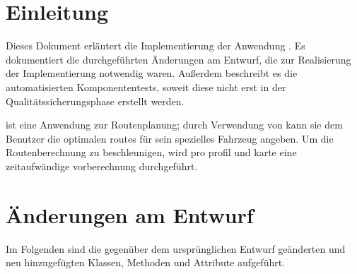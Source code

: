 \documentclass[a4paper, 11pt]{article}
\begin{document}
\section{Einleitung}
Dieses Dokument erläutert die Implementierung der Anwendung \routeKIT. Es dokumentiert die durchgeführten Änderungen am Entwurf, die zur Realisierung der Implementierung notwendig waren. Außerdem beschreibt es die automatisierten Komponententests, soweit diese nicht erst in der Qualitätssicherungsphase erstellt werden.

\routeKIT ist eine Anwendung zur Routenplanung; durch Verwendung von  kann sie dem Benutzer die optimalen \glspl{route} für sein spezielles Fahrzeug angeben.
Um die Routenberechnung zu beschleunigen, wird pro \gls{profil} und \gls{karte} eine zeitaufwändige \gls{vorberechnung} durchgeführt.

\section{Änderungen am Entwurf}
Im Folgenden sind die gegenüber dem ursprünglichen Entwurf geänderten und neu hinzugefügten Klassen, Methoden und Attribute aufgeführt.
\end{document}
